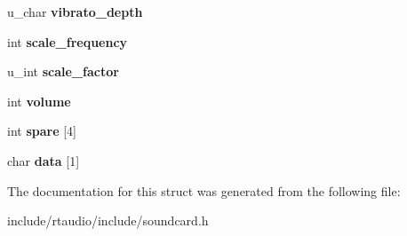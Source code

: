 \begin{DoxyCompactItemize}
\item 
u\+\_\+char {\bfseries vibrato\+\_\+depth}\hypertarget{structpatch__info_afd93b7dc63798b915e7fffec74f59b93}{}\label{structpatch__info_afd93b7dc63798b915e7fffec74f59b93}

\item 
int {\bfseries scale\+\_\+frequency}\hypertarget{structpatch__info_a238593e900f1edaa93f01d41620011b6}{}\label{structpatch__info_a238593e900f1edaa93f01d41620011b6}

\item 
u\+\_\+int {\bfseries scale\+\_\+factor}\hypertarget{structpatch__info_a9bd17963d12b8ebc7c8e8aff0cafdf52}{}\label{structpatch__info_a9bd17963d12b8ebc7c8e8aff0cafdf52}

\item 
int {\bfseries volume}\hypertarget{structpatch__info_a45e5588fce8f2d499c01bca1156c3b0b}{}\label{structpatch__info_a45e5588fce8f2d499c01bca1156c3b0b}

\item 
int {\bfseries spare} \mbox{[}4\mbox{]}\hypertarget{structpatch__info_a15e6ac300f28102aec237c8927995e73}{}\label{structpatch__info_a15e6ac300f28102aec237c8927995e73}

\item 
char {\bfseries data} \mbox{[}1\mbox{]}\hypertarget{structpatch__info_a4e7ffb53f0f5138b892720cea9069f3e}{}\label{structpatch__info_a4e7ffb53f0f5138b892720cea9069f3e}

\end{DoxyCompactItemize}


The documentation for this struct was generated from the following file\+:\begin{DoxyCompactItemize}
\item 
include/rtaudio/include/soundcard.\+h\end{DoxyCompactItemize}
